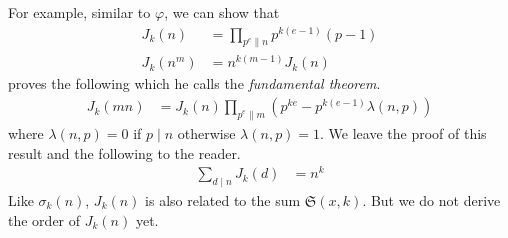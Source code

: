 \documentclass[elemannt.tex]{subfile}
\begin{document}
	For example, similar to $\varphi$, we can show that
		\begin{align*}
			J_{k}(n)
				& = \prod_{p^{e}\|n}p^{k(e-1)}(p-1)\\
			J_{k}(n^{m})
				& = n^{k(m-1)}J_{k}(n)
		\end{align*}
	\textcite[Theorem VI]{lehmer_1900} proves the following which he calls the \textit{fundamental theorem}.
		\begin{align}
			J_{k}(mn)
				& = J_{k}(n)\prod_{p^{e}\parallel m}\left(p^{ke}-p^{k(e-1)}\lambda(n,p)\right)\label{thm:lehfund}
		\end{align}
	where $\lambda(n,p)=0$ if $p\mid n$ otherwise $\lambda(n,p)=1$. We leave the proof of this result and the following to the reader.
		\begin{align*}
			\sum_{d\mid n}J_{k}(d)
				& = n^{k}
		\end{align*}
	 Like $\sigma_{k}(n)$, $J_{k}(n)$ is also  related to the sum $\mathfrak{S}(x, k)$. But we do not derive the order of $J_{k}(n)$ yet.
\end{document}

